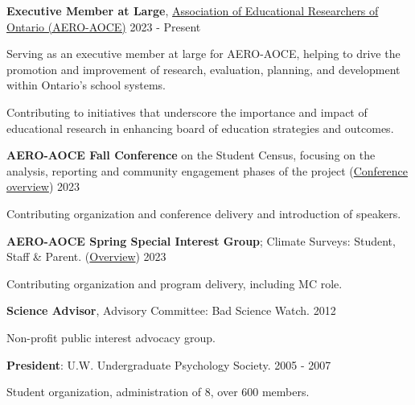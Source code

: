 \documentclass[10pt]{article}
\newenvironment{innerlist}[1][\enskip\textbullet]%
        {\begin{compactenum}[#1]}{\end{compactenum}}
\providecommand{\tightlist}{%
  \setlength{\itemsep}{0pt}\setlength{\parskip}{0pt}}
\begin{document}
\begin{outerlist}
\item
  \textbf{Executive Member at Large},
  \href{https://www.aero-aoce.org/aero-aoce-executiveexeacutecutif-drsquoaero-aoce.html}{Association
  of Educational Researchers of Ontario (AERO-AOCE)} \hfill 2023 -
  Present

 \begin{innerlist}
  \tightlist
  \item
    Serving as an executive member at large for AERO-AOCE, helping to
    drive the promotion and improvement of research, evaluation,
    planning, and development within Ontario's school systems.
  \item
    Contributing to initiatives that underscore the importance and
    impact of educational research in enhancing board of education
    strategies and outcomes.
 \end{innerlist}
\item
  \textbf{AERO-AOCE Fall Conference} on the Student Census, focusing on
  the analysis, reporting and community engagement phases of the project
  (\href{https://mail.google.com/mail/u/0/\#search/aero+fall+conference?projector=1}{Conference
  overview}) \hfill 2023

 \begin{innerlist}
  \tightlist
  \item
    Contributing organization and conference delivery and introduction
    of speakers.
 \end{innerlist}
\item
  \textbf{AERO-AOCE Spring Special Interest Group}; Climate Surveys:
  Student, Staff \& Parent.
  (\href{https://drive.google.com/file/d/1mNDOn_Xfc6B3_2UVLKF-4KWSdrHhBFQp/view}{Overview})
  \hfill 2023

 \begin{innerlist}
  \tightlist
  \item
    Contributing organization and program delivery, including MC role.
 \end{innerlist}
\item
  \textbf{Science Advisor}, Advisory Committee: Bad Science Watch.
  \hfill 2012

 \begin{innerlist}
  \tightlist
  \item
    Non-profit public interest advocacy group.
 \end{innerlist}
\item
  \textbf{President}: U.W. Undergraduate Psychology Society. \hfill 2005
  - 2007

 \begin{innerlist}
  \tightlist
  \item
    Student organization, administration of 8, over 600 members.
 \end{innerlist}
\end{outerlist}
\end{document}
